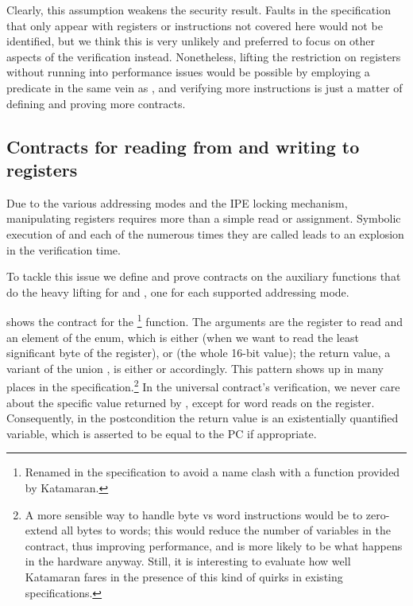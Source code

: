 Clearly, this assumption weakens the security result. Faults in the specification that only appear with registers or instructions not covered here would not be identified, but we think this is very unlikely and preferred to focus on other aspects of the verification instead. Nonetheless, lifting the restriction on registers without running into performance issues would be possible by employing a predicate in the same vein as , and verifying more instructions is just a matter of defining and proving more contracts.

\subsection{Contracts for reading from and writing to registers}

Due to the various addressing modes and the IPE locking mechanism, manipulating registers requires more than a simple read or assignment. Symbolic execution of  and  each of the numerous times they are called leads to an explosion in the verification time.

To tackle this issue we define and prove contracts on the auxiliary functions that do the heavy lifting for  and , one for each supported addressing mode.

 shows the contract for the \footnote{Renamed  in the \usail specification to avoid a name clash with a function provided by Katamaran.} function. The arguments are the register to read and an element of the  enum, which is either  (when we want to read the least significant byte of the register), or  (the whole 16-bit value); the return value, a variant of the union , is either  or  accordingly. This pattern shows up in many places in the \msp \usail specification.\footnote{A more sensible way to handle byte vs word instructions would be to zero-extend all bytes to words; this would reduce the number of variables in the contract, thus improving performance, and is more likely to be what happens in the hardware anyway. Still, it is interesting to evaluate how well Katamaran fares in the presence of this kind of quirks in existing specifications.} In the universal contract's verification, we never care about the specific value returned by , except for word reads on the  register. Consequently, in the postcondition the return value is an existentially quantified variable, which is asserted to be equal to the PC if appropriate.

